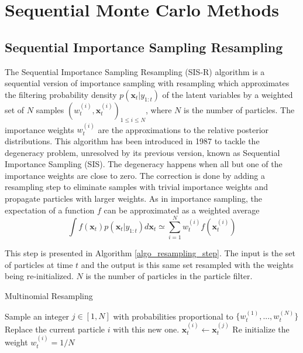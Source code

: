 \documentclass[11pt,a4,twosided,singlespacing,titlepagenumber=on]{scrreprt}
\numberwithin{equation}{chapter} %
\theoremstyle{remark}
\newcommand{\matr}[1]{\mathbf{#1}}
\begin{document}
\section{Sequential Monte Carlo Methods}
\label{section:smc}
\subsection{Sequential Importance Sampling Resampling}
The Sequential Importance Sampling Resampling (SIS-R) algorithm is a sequential version of importance sampling with resampling which approximates the filtering probability density $p(\matr{x}_t|y_{1:t})$ of the latent variables by a weighted set of $N$ samples $(w_t^{(i)}, \matr{x}_t^{(i)})_{1 \leq i \leq N}$, where $N$ is the number of particles. The importance weights $w_t^{(i)}$ are the approximations to the relative posterior distributions. This algorithm has been introduced in 1987 to tackle the degeneracy problem, unresolved by its previous version, known as Sequential Importance Sampling (SIS). The degeneracy happens when all but one of the importance weights are close to zero. The correction is done by adding a resampling step to eliminate samples with trivial importance weights and propagate particles with larger weights. As in importance sampling, the expectation of a function $f$ can be approximated as a weighted average
\begin{equation}
\int f(\matr{x}_t)p(\matr{x}_t|y_{1:t})d \matr{x}_t \simeq \sum_{i=1}^N w_t^{(i)} f(\matr{x}_t^{(i)})
\end{equation}

This step is presented in Algorithm \ref{algo_resampling_step}. The input is the set of particles at time $t$ and the output is this same set resampled with the weights being re-initialized. $N$ is the number of particles in the particle filter.
\begin{algorithm}[H]
\caption{Multinomial Resampling}\label{algo_resampling_step}
\begin{algorithmic}[1]
\Procedure{MultinomialResampling}{$(w_t^{(i)}, \matr{x}_t^{(i)})_{1 \leq i \leq N}$, $N$}
  \State Sample an integer $j \in [1,N]$ with probabilities proportional to $\{w_{t}^{(1)},..., w_{t}^{(N)}\}$
  \State Replace the current particle $i$ with this new one. $\matr{x}_t^{(i)} \gets \matr{x}_t^{(j)}$
  \State Re initialize the weight $w_t^{(i)} = 1/N$
\EndProcedure
\end{algorithmic}
\end{algorithm}
\end{document}
